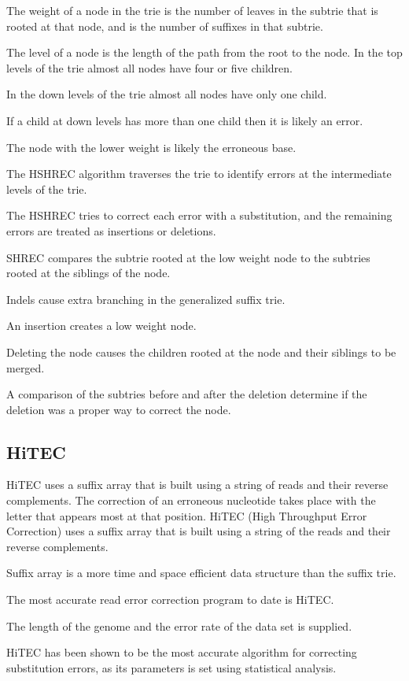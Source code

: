 \documentclass{llncs}
\begin{document}
The weight of a node in the trie is the number of leaves in the subtrie that is rooted at that node, and is the number of suffixes in that subtrie. 

The level of a node is the length of the path from the root to the node.
In the top levels of the trie almost all nodes have four or five children.

In the down levels of the trie almost all nodes have only one child. 

If a child at down levels has more than one child then it is likely an error. 

The node with the lower weight is likely the erroneous base. 

The HSHREC algorithm traverses the trie to identify errors at the intermediate levels of the trie. 

The HSHREC tries to correct each error with a substitution, and the remaining errors are treated as insertions or deletions.

SHREC compares the subtrie rooted at the low weight node to the subtries rooted at the siblings of the node.

Indels cause extra branching in the generalized suffix trie. 

An insertion creates a low weight node.

Deleting the node causes the children rooted at the node and their siblings to
be merged. 

A comparison of the subtries before and after the deletion determine if the deletion
was a proper way to correct the node. 

\subsection{HiTEC}
HiTEC \cite{HiTec} uses a suffix array that is built using a string of reads and their reverse complements. The correction of an erroneous nucleotide takes place with the letter that appears most at that position.
HiTEC (High Throughput Error Correction) uses a suffix array that is built using a string of the reads and their reverse complements. 

Suffix array is a more time and space efficient data structure than the suffix trie.

The most accurate read error correction program to date is HiTEC.

The length of the genome and the error rate of the data set is supplied. 

HiTEC has been shown to be the most accurate algorithm for correcting substitution errors, as its parameters is set using statistical analysis.
\end{document}
